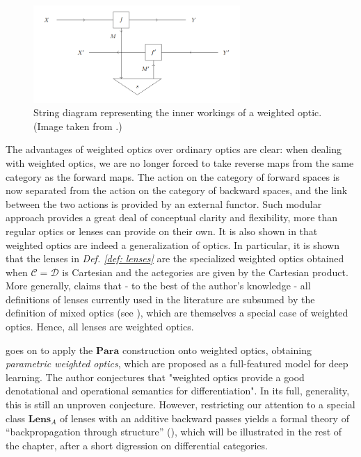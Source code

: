 \documentclass[11pt,a4paper,openright,twoside]{report}
\theoremstyle{plain}
\theoremstyle{definition}
\newcommand\dblquote[1]{\textquotedblleft #1\textquotedblright}
\begin{document}
\begin{figure}[h]
  \begin{center}
    \includegraphics[width=0.7\textwidth]{figures/weighted_optic.png}             
    \caption[Weighted optic]{String diagram representing the inner workings of a weighted optic. (Image taken from \cite{gavranovic2024fundamental}.)}
    \label{fig: weightedoptic}
  \end{center}
\end{figure}

The advantages of weighted optics over ordinary optics are clear: when dealing with weighted optics, we are no longer forced to take reverse maps from the same category as the forward maps. The action on the category of forward spaces is now separated from the action on the category of backward spaces, and the link between the two actions is provided by an external functor. Such modular approach provides a great deal of conceptual clarity and flexibility, more than regular optics or lenses can provide on their own. It is also shown in \cite{gavranovic2024fundamental} that weighted optics are indeed a generalization of optics. In particular, it is shown that the lenses in \textit{Def. \ref{def: lenses}} are the specialized weighted optics obtained when $\mathcal{C} = \mathcal{D}$ is Cartesian and the actegories are given by the Cartesian product. More generally, \cite{gavranovic2024fundamental} claims that - to the best of the author's knowledge - all definitions of lenses currently used in the literature are subsumed by the definition of mixed optics (see \cite{clarke2024profunctor}), which are themselves a special case of weighted optics. Hence, all lenses are weighted optics.

\cite{gavranovic2024fundamental} goes on to apply the $\mathbf{Para}$ construction onto weighted optics, obtaining \textit{parametric weighted optics}, which are proposed as a full-featured model for deep learning. The author conjectures that "weighted optics provide a good denotational and operational semantics for differentiation". In its full, generality, this is still an unproven conjecture. However, restricting our attention to a special class $\mathbf{Lens}_A$ of lenses with an additive backward passes yields a formal theory of \dblquote{backpropagation through structure} (\cite{gavranovic2024fundamental}), which will be illustrated in the rest of the chapter, after a short digression on differential categories.
\end{document}
